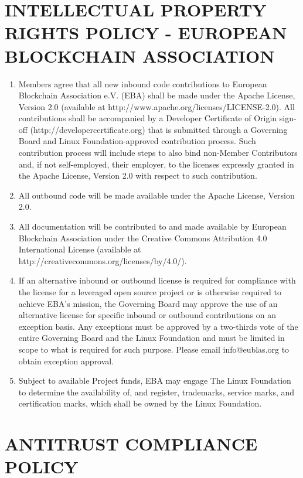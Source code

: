 \documentclass{article}
\begin{document}
\newpage

\section{INTELLECTUAL PROPERTY RIGHTS POLICY - EUROPEAN BLOCKCHAIN ASSOCIATION}

\begin{enumerate}
	\item Members agree that all new inbound code contributions to European Blockchain Association e.V. (EBA) shall be made under the Apache License, Version 2.0 (available at http://www.apache.org/licenses/LICENSE-2.0).
	 All contributions shall be accompanied by a Developer Certificate of Origin sign-off (http://developercertificate.org) that is submitted through a Governing Board and Linux Foundation-approved contribution process. 
	 Such contribution process will include steps to also bind non-Member Contributors and, if not self-employed, their employer, to the licenses expressly granted in the Apache License, Version 2.0 with respect to such contribution.
	 \item All outbound code will be made available under the Apache License, Version 2.0.
	 \item All documentation will be contributed to and made available by European Blockchain Association under the Creative Commons Attribution 4.0 International License (available at http://creativecommons.org/licenses/by/4.0/).
	 \item If an alternative inbound or outbound license is required for compliance with the license for a leveraged open source project or is otherwise required to achieve EBA’s mission, the Governing Board may approve the use of an alternative license for specific inbound or outbound contributions on an exception basis. 
	 Any exceptions must be approved by a two-thirds vote of the entire Governing Board and the Linux Foundation and must be limited in scope to what is required for such purpose.
	  Please email info@eublas.org to obtain exception approval.
	  \item Subject to available Project funds, EBA may engage The Linux Foundation to determine the availability of, and register, trademarks, service marks, and certification marks, which shall be owned by the Linux Foundation.
\end{enumerate} 

\newpage

\section{ANTITRUST COMPLIANCE POLICY}
\end{document}
